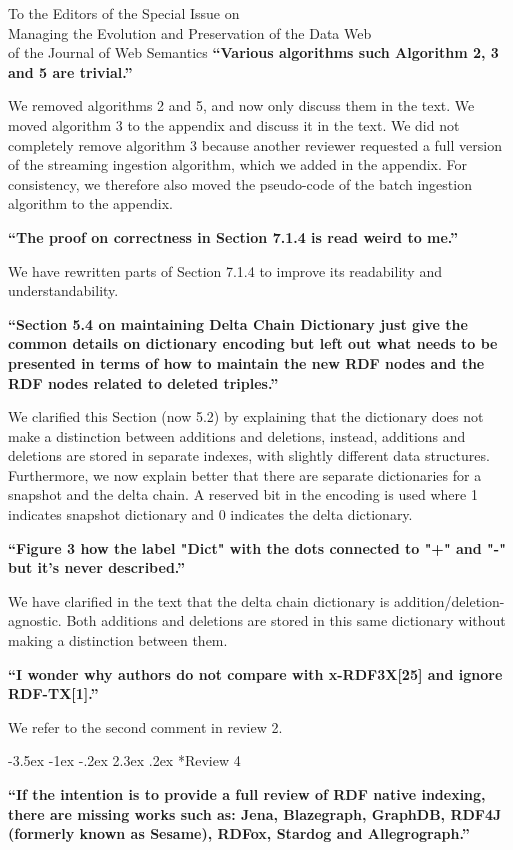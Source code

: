 \documentclass{letter}
\makeatletter
\newcounter{section}
\newcommand\section{\@startsection {section}{1}{\z@}%
                                   {-3.5ex \@plus -1ex \@minus -.2ex}%
                                   {2.3ex \@plus.2ex}%
                                   {\normalfont\Large\bfseries}}
\makeatother
\begin{document}
\begin{letter}{To the Editors of the Special Issue on\\Managing the Evolution and Preservation of the Data Web\\of the Journal of Web Semantics}
\textbf{\enquote{Various algorithms such Algorithm 2, 3 and 5 are trivial.}}

We removed algorithms 2 and 5, and now only discuss them in the text.
We moved algorithm 3 to the appendix and discuss it in the text.
We did not completely remove algorithm 3 because another reviewer requested
a full version of the streaming ingestion algorithm, which we added in the appendix.
For consistency, we therefore also moved the pseudo-code of the batch ingestion algorithm to the appendix.

\textbf{\enquote{The proof on correctness in Section 7.1.4 is read weird to me.}}

We have rewritten parts of Section 7.1.4 to improve its readability and understandability.

\textbf{\enquote{Section 5.4 on maintaining Delta Chain Dictionary just give the common details on dictionary encoding but left out what needs to be presented in terms of how to maintain the new RDF nodes and the RDF nodes related to deleted triples.}}

We clarified this Section (now 5.2) by explaining that the dictionary does not make a distinction between additions and deletions,
instead, additions and deletions are stored in separate indexes, with slightly different data structures.
Furthermore, we now explain better that there are separate dictionaries for a snapshot and the delta chain.
A reserved bit in the encoding is used where 1 indicates snapshot dictionary and 0 indicates the delta dictionary.

\textbf{\enquote{Figure 3 how the label "Dict" with the dots connected to "+" and "-" but it's never described.}}

We have clarified in the text that the delta chain dictionary is addition/deletion-agnostic.
Both additions and deletions are stored in this same dictionary without making a distinction between them.

\textbf{\enquote{I wonder why authors do not compare with x-RDF3X[25] and ignore RDF-TX[1].}}

We refer to the second comment in review 2.

\pagebreak
\section*{Review 4}

\textbf{\enquote{If the intention is to provide a full review of RDF native indexing, there are missing works such as: Jena, Blazegraph, GraphDB, RDF4J (formerly known as Sesame), RDFox, Stardog and Allegrograph.}}


\end{letter}
\end{document}

